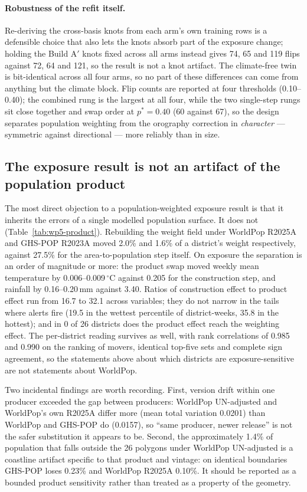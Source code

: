 \paragraph{Robustness of the refit itself.} Re-deriving the cross-basis knots from each arm's own training rows is a defensible choice that also lets the knots absorb part of the exposure change; holding the Build A$'$ knots fixed across all arms instead gives 74, 65 and 119 flips against 72, 64 and 121, so the result is not a knot artifact. The climate-free twin is bit-identical across all four arms, so no part of these differences can come from anything but the climate block. Flip counts are reported at four thresholds (0.10--0.40); the combined rung is the largest at all four, while the two single-step rungs sit close together and swap order at $p^*=0.40$ (60 against 67), so the design separates population weighting from the orography correction in \emph{character} --- symmetric against directional --- more reliably than in size.

\subsection{The exposure result is not an artifact of the population product}
\label{sec:results-wp5-product}

The most direct objection to a population-weighted exposure result is that it inherits the errors of a single modelled population surface. It does not (Table~\ref{tab:wp5-product}). Rebuilding the weight field under WorldPop R2025A and GHS-POP R2023A moved 2.0\% and 1.6\% of a district's weight respectively, against 27.5\% for the area-to-population step itself. On exposure the separation is an order of magnitude or more: the product swap moved weekly mean temperature by 0.006--0.009\,$^{\circ}$C against 0.205 for the construction step, and rainfall by 0.16--0.20\,mm against 3.40. Ratios of construction effect to product effect run from 16.7 to 32.1 across variables; they do not narrow in the tails where alerts fire (19.5 in the wettest percentile of district-weeks, 35.8 in the hottest); and in 0 of 26 districts does the product effect reach the weighting effect. The per-district reading survives as well, with rank correlations of 0.985 and 0.990 on the ranking of movers, identical top-five sets and complete sign agreement, so the statements above about which districts are exposure-sensitive are not statements about WorldPop.

Two incidental findings are worth recording. First, version drift within one producer exceeded the gap between producers: WorldPop UN-adjusted and WorldPop's own R2025A differ more (mean total variation 0.0201) than WorldPop and GHS-POP do (0.0157), so ``same producer, newer release'' is not the safer substitution it appears to be. Second, the approximately 1.4\% of population that falls outside the 26 polygons under WorldPop UN-adjusted is a coastline artifact specific to that product and vintage: on identical boundaries GHS-POP loses 0.23\% and WorldPop R2025A 0.10\%. It should be reported as a bounded product sensitivity rather than treated as a property of the geometry.

